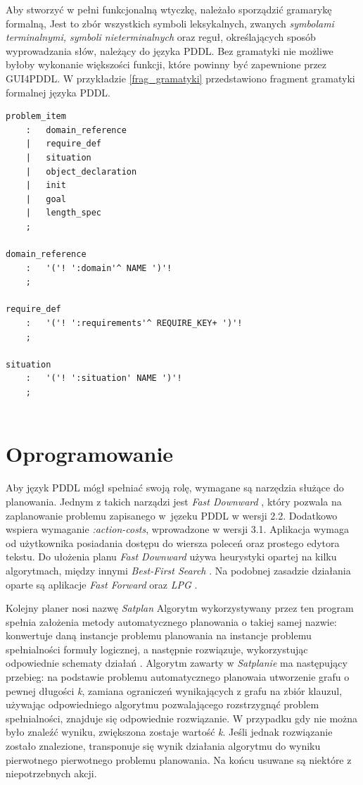 Aby stworzyć w pełni funkcjonalną wtyczkę, należało sporządzić gramarykę formalną, Jest to zbór wszystkich symboli leksykalnych, zwanych \emph{symbolami terminalnymi, symboli nieterminalnych} oraz reguł, określających sposób wyprowadzania słów, należący do języka PDDL. Bez gramatyki nie możliwe byłoby wykonanie większości funkcji, które powinny być zapewnione przez GUI4PDDL. W przykładzie \ref{frag_gramatyki} przedstawiono fragment gramatyki formalnej języka PDDL.\\
\begin{Code}
\begin{lstlisting}[language=LISP,frame=single,label={frag_gramatyki}, caption={Fragment gramatyki formalnej}]
problem_item
	:	domain_reference
	|	require_def
	|	situation
	|	object_declaration
	|	init
	|	goal
	|	length_spec
	;

domain_reference 
	:	'('! ':domain'^ NAME ')'!
	;
	
require_def
	:	'('! ':requirements'^ REQUIRE_KEY+ ')'!
	;
	
situation 
	:	'('! ':situation' NAME ')'!
	;
	
\end{lstlisting}
\end{Code} 
\section{Oprogramowanie}
Aby język PDDL mógł spełniać swoją rolę, wymagane są narzędzia służące do planowania. Jednym z takich narządzi jest \textit{Fast Downward} \cite{fastdownward}, który pozwala na zaplanowanie problemu zapisanego w~jęzeku PDDL w wersji 2.2. Dodatkowo wspiera wymaganie \textit{:action-costs}, wprowadzone w wersji 3.1. Aplikacja wymaga od użytkownika posiadania dostępu do wiersza poleceń oraz prostego edytora tekstu. Do ułożenia planu \textit{Fast Downward} używa heurystyki opartej na kilku algorytmach, między innymi \textit{Best-First Search} \cite{fdalgorytm}. Na podobnej zasadzie działania oparte są aplikacje \textit{Fast Forward} \cite{fastforward} oraz \textit{LPG} \cite{lpg}.

Kolejny planer nosi nazwę \textit{Satplan}\cite{satplanprog} Algorytm wykorzystywany przez ten program spełnia założenia metody automatycznego planowania o takiej samej nazwie: konwertuje daną instancje problemu planowania na instancje problemu spełnialności formuły logicznej, a następnie rozwiązuje, wykorzystując odpowiednie schematy działań \cite{satplan}. Algorytm zawarty w \textit{Satplanie} ma następujący przebieg: na podstawie problemu automatycznego planowaia utworzenie grafu o pewnej długości \textit{k}, zamiana ograniczeń wynikających z grafu na zbiór klauzul, używając odpowiedniego algorytmu pozwalającego rozstrzygnąć problem spełnialności, znajduje się odpowiednie rozwiązanie. W przypadku gdy nie można było znaleźć wyniku, zwiększona zostaje wartość \textit{k}. Jeśli jednak rozwiązanie zostało znalezione, transponuje się wynik działania algorytmu do wyniku pierwotnego pierwotnego problemu planowania. Na końcu usuwane są niektóre z niepotrzebnych akcji.

